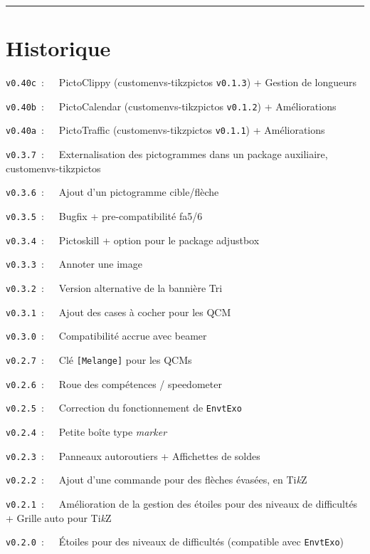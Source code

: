 \documentclass[french,11pt,a4paper]{article}
\providecommand\tikzlogo{Ti\textit{k}Z}
\let\TikZ\tikzlogo
\begin{document}
\tableofcontents

\vspace*{5mm}

\hrule

\pagebreak

\section{Historique}

\verb|v0.40c|~:~~~PictoClippy (\textsf{customenvs-tikzpictos} \texttt{v0.1.3}) + Gestion de longueurs

\verb|v0.40b|~:~~~PictoCalendar (\textsf{customenvs-tikzpictos} \texttt{v0.1.2}) + Améliorations

\verb|v0.40a|~:~~~PictoTraffic (\textsf{customenvs-tikzpictos} \texttt{v0.1.1}) + Améliorations

\verb|v0.3.7|~:~~~Externalisation des pictogrammes dans un package auxiliaire, \textsf{customenvs-tikzpictos}

\verb|v0.3.6|~:~~~Ajout d'un pictogramme \textsf{cible/flèche}

\verb|v0.3.5|~:~~~Bugfix + pre-compatibilité \textsf{fa5/6}

\verb|v0.3.4|~:~~~Pictoskill + option pour le package \textsf{adjustbox}

\verb|v0.3.3|~:~~~Annoter une image

\verb|v0.3.2|~:~~~Version alternative de la bannière \textsf{Tri}

\verb|v0.3.1|~:~~~Ajout des cases à cocher pour les \textsf{QCM}

\verb|v0.3.0|~:~~~Compatibilité accrue avec \textsf{beamer}

\verb|v0.2.7|~:~~~Clé \texttt{[Melange]} pour les QCMs

\verb|v0.2.6|~:~~~Roue des compétences / speedometer

\verb|v0.2.5|~:~~~Correction du fonctionnement de \texttt{EnvtExo}

\verb|v0.2.4|~:~~~Petite boîte type \textit{marker}

\verb|v0.2.3|~:~~~Panneaux autoroutiers + Affichettes de soldes

\verb|v0.2.2|~:~~~Ajout d'une commande pour des flèches évasées, en \TikZ\

\verb|v0.2.1|~:~~~Amélioration de la gestion des étoiles pour des niveaux de difficultés + Grille auto pour \TikZ\

\verb|v0.2.0|~:~~~Étoiles pour des niveaux de difficultés (compatible avec \texttt{EnvtExo})
\end{document}
